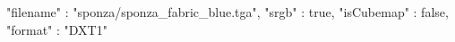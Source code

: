 { 
	"filename" : "sponza/sponza_fabric_blue.tga", 
	"srgb" : true,
	"isCubemap" : false,
	"format" : "DXT1"
}